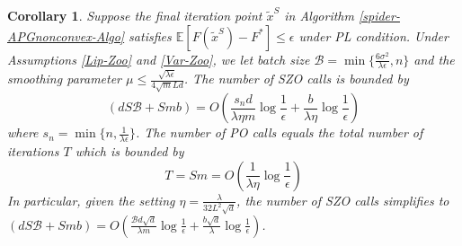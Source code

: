 \documentclass[iicol,sn-basic]{sn-jnl}
\theoremstyle{thmstyleone}%
\theoremstyle{thmstyletwo}%
\theoremstyle{thmstylethree}%
\newcommand*{\E}{\mathbb{E}}
\newtheorem{corollary}[theorem]{Corollary}
\begin{document}
\begin{corollary}\label{spider-PL-Zo-Cor-rand}
Suppose the final iteration point $\tilde{x}^S$ in Algorithm \ref{spider-APGnonconvex-Algo} satisfies $\E[F(\tilde{x}^S) - F^*]\leq \epsilon$ under PL condition. Under Assumptions \ref{Lip-Zoo} and \ref{Var-Zoo}, we let batch size $\mathcal{B} = \min\{\frac{6\sigma^2}{\lambda\epsilon},n\}$ and the smoothing parameter $\mu \leq \frac{\sqrt{\lambda\epsilon}}{4 \sqrt{m} L d}$. The number of SZO calls is bounded by
\[
(dS\mathcal{B}+Smb) = O(\frac{s_n d}{\lambda\eta m}\log\frac{1}{\epsilon}+\frac{b }{\lambda\eta}\log\frac{1}{\epsilon})
\]
where $s_n = \min \{n,\frac{1}{\lambda \epsilon}\}$.
The number of PO calls equals the total number of iterations $T$ which is bounded by
\[
T = Sm = O(\frac{1}{\lambda\eta}\log\frac{1}{\epsilon})
\]
In particular, given the setting  $\eta = \frac{\lambda}{32 L^2\sqrt{d}}$, the number of SZO calls  simplifies to 
$(dS\mathcal{B}+Smb) = O(\frac{\mathcal{B}d\sqrt{d}}{\lambda m}\log\frac{1}{\epsilon}+\frac{b\sqrt{d}}{\lambda}\log\frac{1}{\epsilon})$.
\end{corollary}
\end{document}
